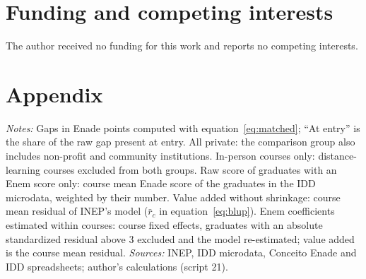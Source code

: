 \documentclass[11pt,a4paper]{article}
\begin{document}
\section*{Funding and competing interests}
The author received no funding for this work and reports no competing interests.




\clearpage
\appendix
\renewcommand{\thetable}{A\arabic{table}}
\setcounter{table}{0}
\section*{Appendix}

\begin{table}[!htbp]
\centering\small
\caption{Federal minus private for-profit courses of the same area under alternative specifications, Enade 2022 and 2023}\label{tab:altspec}
\resizebox{\linewidth}{!}{}
\begin{minipage}{\linewidth}\vspace{0.4em}\scriptsize
\textit{Notes:} Gaps in Enade points computed with equation~\eqref{eq:matched}; ``At entry'' is the share of the raw gap present at entry. All private: the comparison group also includes non-profit and community institutions. In-person courses only: distance-learning courses excluded from both groups. Raw score of graduates with an Enem score only: course mean Enade score of the graduates in the IDD microdata, weighted by their number. Value added without shrinkage: course mean residual of INEP's model ($\bar r_c$ in equation~\eqref{eq:blup}). Enem coefficients estimated within courses: course fixed effects, graduates with an absolute standardized residual above 3 excluded and the model re-estimated; value added is the course mean residual. \textit{Sources:} INEP, IDD microdata, Conceito Enade and IDD spreadsheets; author's calculations (script 21).
\end{minipage}
\end{table}
\end{document}
